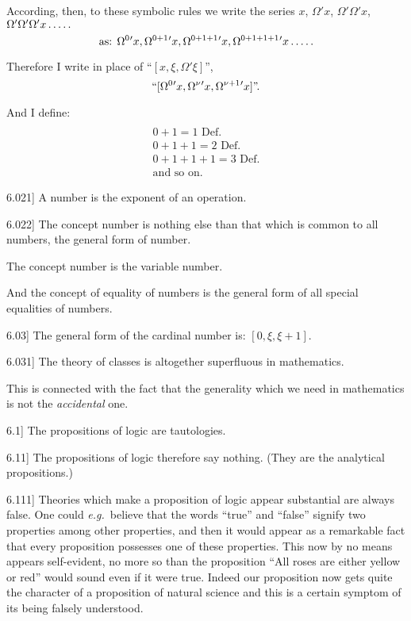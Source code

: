 \documentclass[12pt,oneside]{book}[2007/10/19]
\newcommand{\PropositionE}[2]{%
  \item[\phantomsection\label{PropE:#1}\PropGRef{#1}] #2%
}
\newcommand{\PropGRef}[1]{\hyperref[PropG:#1]{#1}}
\newcommand{\exempliGratia}{\textit{e.g.}}
\newcommand{\fivedots}{\mathinner{\ldotp\ldotp\ldotp\ldotp\ldotp}}
\begin{document}
\begin{propositions}
{According, then, to these symbolic rules we
write the series $x$, $\Omega'x$, $\Omega'\Omega'x$, $\Omega'\Omega'\Omega'x\fivedots$
\[
\text{as: } \Omega^{0}{}'x, \Omega^{0+1}{}'x, \Omega^{0+1+1}{}'x, \Omega^{0+1+1+1}{}'x\fivedots
\]

Therefore I write in place of ``$[x, \xi, \Omega'\xi]$'',
\[
``[\Omega^{0}{}'x, \Omega^{\nu}{}'x, \Omega^{\nu+1}{}'x]\text{''.}
\]

And I define:
\[
\begin{array}{l}\\
0 + 1 = 1\text{ Def.}\\
0 + 1 + 1 = 2\text{ Def.}\\
0 + 1 + 1 + 1 = 3\text{ Def.}\\
\text{and so on.}
\end{array}
\]}

\PropositionE{6.021}
{A number is the exponent of an operation.}


\PropositionE{6.022}
{The concept number is nothing else than that
which is common to all numbers, the general form
of number.

The concept number is the variable number.

And the concept of equality of numbers is the
general form of all special equalities of numbers.}


\PropositionE{6.03}
{The general form of the cardinal number is:
$[0, \xi, \xi + 1]$.}


\PropositionE{6.031}
{The theory of classes is altogether superfluous
in mathematics.

This is connected with the fact that the generality
which we need in mathematics is not the
\emph{accidental} one.}


\PropositionE{6.1}
{The propositions of logic are tautologies.}


\PropositionE{6.11}
{The propositions of logic therefore say nothing.
(They are the analytical propositions.)}


\PropositionE{6.111}
{Theories which make a proposition of logic
appear substantial are always false. One could
\exempliGratia\ believe that the words ``true'' and ``false''
signify two properties among other properties,
and then it would appear as a remarkable fact
that every proposition possesses one of these
properties. This now by no means appears self-evident,
no more so than the proposition ``All
roses are either yellow or red'' would sound even
if it were true. Indeed our proposition now gets
quite the character of a proposition of natural
science and this is a certain symptom of its being
falsely understood.}



\end{propositions}
\end{document}
